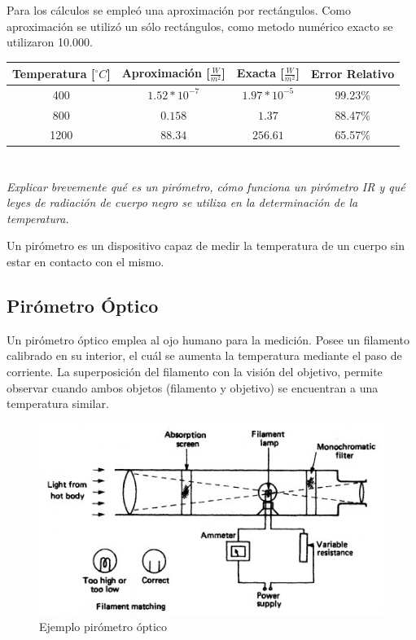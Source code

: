 \documentclass[12pt,a4paper]{article}
\begin{document}
		Para los cálculos se empleó una aproximación por rectángulos. Como aproximación se utilizó un sólo rectángulos,
		como metodo numérico exacto se utilizaron 10.000.

		\begin{center}
					
			{\footnotesize \begin{tabular}{ |c|c|c|c|}
		
			\hline
			Temperatura [$^{\circ}C$] & Aproximación [$\frac{W}{m^2}$]& Exacta [$\frac{W}{m^2}$] & Error Relativo \\ \hline
			400 \cellcolor{Gray} & $1.52 * 10^{-7}$ & $1.97 * 10^{-5}$ & 99.23\%\\ \hline
			800 \cellcolor{Gray} & $0.158$ & $1.37$ & 88.47\%\\ \hline
			1200 \cellcolor{Gray} & $88.34$ & $256.61$ & 65.57\%\\ \hline
			\end{tabular}}
		\end{center}

	\section{}\label{sec_d}
		\textit{
		Explicar brevemente qué es un pirómetro, cómo funciona un pirómetro IR y qué leyes de radiación de cuerpo negro se utiliza en la determinación de la temperatura.
		}

		Un pirómetro es un dispositivo capaz de medir la temperatura de un cuerpo sin estar en contacto con el mismo. 

		\subsection{Pirómetro Óptico}
			Un pirómetro óptico emplea al ojo humano para la medición. Posee un filamento calibrado en su interior, el cuál se aumenta la temperatura mediante el paso de corriente. La superposición del filamento con la visión del objetivo, permite observar cuando ambos objetos (filamento y objetivo) se encuentran a una temperatura similar.

			\begin{figure}[H]
				\centering\includegraphics[scale=.8]{images/optical-pyrometer.jpg}\caption{Ejemplo pirómetro óptico}
			\end{figure}
\end{document}
